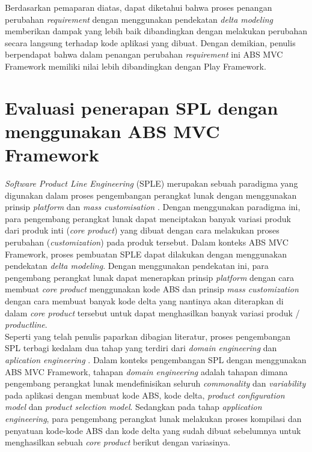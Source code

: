Berdasarkan pemaparan diatas, dapat diketahui bahwa proses penangan perubahan \textit{requirement} dengan menggunakan pendekatan \textit{delta modeling} memberikan dampak yang lebih baik dibandingkan dengan melakukan perubahan secara langsung terhadap kode aplikasi yang dibuat. Dengan demikian, penulis berpendapat bahwa dalam penangan perubahan \textit{requirement} ini ABS MVC Framework memiliki nilai lebih dibandingkan dengan Play Framework.

\section{Evaluasi penerapan SPL dengan menggunakan ABS MVC Framework}

\textit{Software Product Line Engineering} (SPLE) merupakan sebuah paradigma yang digunakan dalam proses pengembangan perangkat lunak dengan menggunakan prinsip \textit{platform} dan \textit{mass customisation} \citep[p.~14]{pohl2005software}. Dengan menggunakan paradigma ini, para pengembang perangkat lunak dapat menciptakan banyak variasi produk dari produk inti (\textit{core product}) yang dibuat dengan cara melakukan proses perubahan (\textit{customization}) pada produk tersebut. Dalam konteks ABS MVC Framework, proses pembuatan SPLE dapat dilakukan dengan menggunakan pendekatan \textit{delta modeling}. Dengan menggunakan pendekatan ini, para pengembang perangkat lunak dapat menerapkan prinsip \textit{platform} dengan cara membuat \textit{core product} menggunakan kode ABS dan prinsip \textit{mass customization} dengan cara membuat banyak kode delta yang nantinya akan diterapkan di dalam \textit{core product} tersebut untuk dapat menghasilkan banyak variasi produk / \textit{productline}.\\

Seperti yang telah penulis paparkan dibagian literatur, proses pengembangan SPL terbagi kedalam dua tahap yang terdiri dari \textit{domain engineering} dan \textit{aplication engineering} \citep[p.~21]{pohl2005software}. Dalam konteks pengembangan SPL dengan menggunakan ABS MVC Framework, tahapan \textit{domain engineering} adalah tahapan dimana pengembang perangkat lunak mendefinisikan seluruh \textit{commonality} dan \textit{variability} pada aplikasi dengan membuat kode ABS, kode delta, \textit{product configuration model} dan \textit{product selection model}. Sedangkan pada tahap \textit{application engineering}, para pengembang perangkat lunak melakukan proses kompilasi dan penyatuan kode-kode ABS dan kode delta yang sudah dibuat sebelumnya untuk menghasilkan sebuah \textit{core product} berikut dengan variasinya.\\

